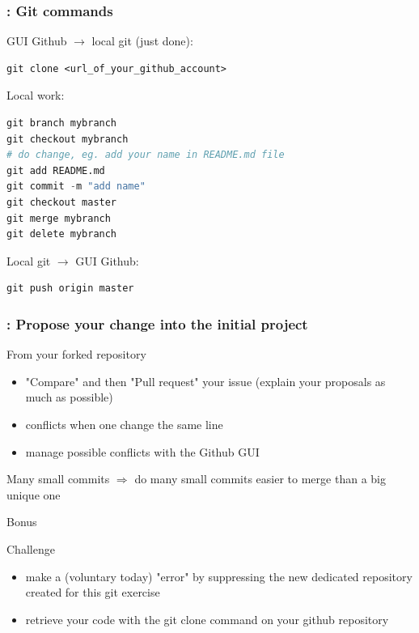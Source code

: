 \begin{frame}[containsverbatim]
\frametitle{: Git commands}
\begin{exampleblock}{GUI Github $\rightarrow$ local git (just done):}
\begin{lstlisting}
git clone <url_of_your_github_account>
\end{lstlisting}
\end{exampleblock}
\begin{exampleblock}{Local work:}
\begin{lstlisting}[language=python]
git branch mybranch
git checkout mybranch
# do change, eg. add your name in README.md file
git add README.md
git commit -m "add name"
git checkout master
git merge mybranch
git delete mybranch
\end{lstlisting}
\end{exampleblock}
\begin{exampleblock}{Local git $\rightarrow$ GUI Github:}
\begin{lstlisting}
git push origin master
\end{lstlisting}
\end{exampleblock}
\end{frame}
\begin{frame}[containsverbatim]
\frametitle{: Propose your change into the initial project}
\begin{exampleblock}{From your forked repository} 
\begin{itemize}
    \item "Compare" and then "Pull request" your issue (explain your proposals as much as possible)
    \item conflicts when one change the same line 
    \item manage possible conflicts with the Github GUI
\end{itemize}
\end{exampleblock}
\begin{exampleblock}{Many small commits} 
$\Rightarrow$ do many small commits easier to merge than a big unique one
\end{exampleblock}
\end{frame}
\begin{frame}{Bonus}
\begin{exampleblock}{Challenge}
\begin{itemize}
    \item make a (voluntary today) "error" by suppressing the new dedicated repository created for this git exercise
    \item retrieve your code with the git clone command on your github repository
\end{itemize}
\end{exampleblock}
\end{frame}